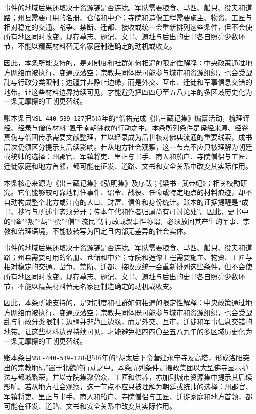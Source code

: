 事件的地域后果还取决于资源链是否连续。军队需要粮食、马匹、船只、役夫和道路；州县需要可用的名册、仓储和中介；寺院和造像工程需要施主、物资、工匠与相对稳定的交通。战争、禁断、迁都、接收或统一会重新排列这些条件，但不会使所有地区同时改变。现存墓志、题记、文书、遗址与后出的史书各自照亮少数环节，不能以精英材料替无名家庭制造确定的动机或收支。

因此，本条所能支持的，是对制度和社群如何相遇的限定性解释：中央政策通过地方网络而被执行、变通或落空；宗教共同体既可能参与城市和资源组织，也会受战乱与行政分类限制；边疆并非静止边缘，而是外交、互市、迁徙和军事信息交错的地带。让这些材料边界持续可见，才能避免把四四〇至五八九年的多区域历史化为一条无摩擦的王朝更替线。

账本条目\texttt{NSL-440-589-127}把515年的“僧祐完成《出三藏记集》编纂活动，梳理译经、经录与僧传材料”置于南朝佛教的行动之中。本条所列条件是译经来源、经卷真伪与僧团传承需要文献整理，并以经录成为后世核对佛典流通的重要线索，成书层次仍须区分提示其后续影响。若从地方社会观察，这一节点不应只被理解为朝廷或统帅的选择：州郡官、军镇将吏、里正与书手、商人和船户、寺院僧侣与工匠、迁徙家庭和地方首领，都可能在征发、道路、文书和安全关系中改变其实际作用。

本条核心来源为《出三藏记集》《弘明集》及序跋；《梁书·武帝纪》；相关校勘研究。它们能够较可靠地钉住事件、诏令、战役、任命或特定地点的材料痕迹，却不自动构成整个北方或江南的人口、财富、信仰和身份统计。账本的证据提醒是“成书、抄写与所述事态须分开；传本年代和作者归属尚有可讨论处”。因此，史书中的“降”“叛”“胡”“蛮”“僧”“流民”等行政或叙事性称谓，必须放回其产生的军事、宗教和治理语境，不能被转写为固定且内部无差异的社会实体。

事件的地域后果还取决于资源链是否连续。军队需要粮食、马匹、船只、役夫和道路；州县需要可用的名册、仓储和中介；寺院和造像工程需要施主、物资、工匠与相对稳定的交通。战争、禁断、迁都、接收或统一会重新排列这些条件，但不会使所有地区同时改变。现存墓志、题记、文书、遗址与后出的史书各自照亮少数环节，不能以精英材料替无名家庭制造确定的动机或收支。

因此，本条所能支持的，是对制度和社群如何相遇的限定性解释：中央政策通过地方网络而被执行、变通或落空；宗教共同体既可能参与城市和资源组织，也会受战乱与行政分类限制；边疆并非静止边缘，而是外交、互市、迁徙和军事信息交错的地带。让这些材料边界持续可见，才能避免把四四〇至五八九年的多区域历史化为一条无摩擦的王朝更替线。

账本条目\texttt{NSL-440-589-128}把516年的“胡太后下令营建永宁寺及高塔，形成洛阳突出的宗教地标”置于北魏的行动之中。本条所列条件是摄政集团以大型佛寺显示护法与都城繁荣，并以寺院集聚僧众、工匠和供养，亦加剧城市资源集中提示其后续影响。若从地方社会观察，这一节点不应只被理解为朝廷或统帅的选择：州郡官、军镇将吏、里正与书手、商人和船户、寺院僧侣与工匠、迁徙家庭和地方首领，都可能在征发、道路、文书和安全关系中改变其实际作用。

